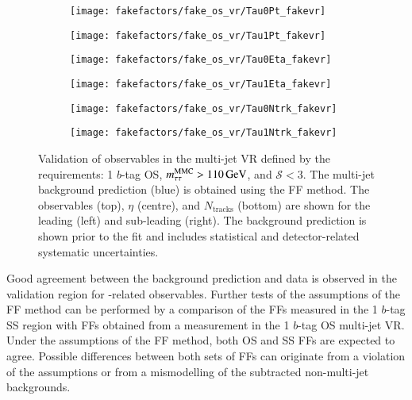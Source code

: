 \begin{figure}[htbp]
  \centering

  \begin{subfigure}{0.44\textwidth}
    \texttt{[image: fakefactors/fake\_os\_vr/Tau0Pt\_fakevr]}
  \end{subfigure}\hspace*{0.04\textwidth}%
  \begin{subfigure}{0.44\textwidth}
    \texttt{[image: fakefactors/fake\_os\_vr/Tau1Pt\_fakevr]}
  \end{subfigure}

  \begin{subfigure}{0.44\textwidth}
    \texttt{[image: fakefactors/fake\_os\_vr/Tau0Eta\_fakevr]}
  \end{subfigure}\hspace*{0.04\textwidth}%
  \begin{subfigure}{0.44\textwidth}
    \texttt{[image: fakefactors/fake\_os\_vr/Tau1Eta\_fakevr]}
  \end{subfigure}

  \begin{subfigure}{0.44\textwidth}
    \texttt{[image: fakefactors/fake\_os\_vr/Tau0Ntrk\_fakevr]}
  \end{subfigure}\hspace*{0.04\textwidth}%
  \begin{subfigure}{0.44\textwidth}
    \texttt{[image: fakefactors/fake\_os\_vr/Tau1Ntrk\_fakevr]}
  \end{subfigure}

  \caption{Validation of \tauhadvis observables in the multi-jet VR defined by
    the requirements: 1 $b$-tag OS, $m_{\tau\tau}^\text{MMC} > \SI{110}{\ensuremath{\text{GeV}}}$, and
    $\mathcal{S} < 3$. The multi-jet background prediction (blue) is obtained
    using the FF method. The \tauhadvis observables \pT (top), $\eta$ (centre),
    and $N_{\text{tracks}}$ (bottom) are shown for the leading (left) and
    sub-leading \tauhadvis (right). The background prediction is shown prior to
    the fit and includes statistical and detector-related systematic
    uncertainties.}%
  \label{fig:fake_factor_OSVR_kinematics}%
\end{figure}

Good agreement between the background prediction and data is observed in the
validation region for \tauhadvis-related observables. Further tests of the
assumptions of the FF method can be performed by a comparison of the FFs
measured in the 1 $b$-tag SS region with FFs obtained from a measurement in the
1 $b$-tag OS multi-jet VR. Under the assumptions of the FF method, both OS and
SS FFs are expected to agree. Possible differences between both sets of FFs can
originate from a violation of the assumptions or from a mismodelling of the
subtracted non-multi-jet backgrounds.

